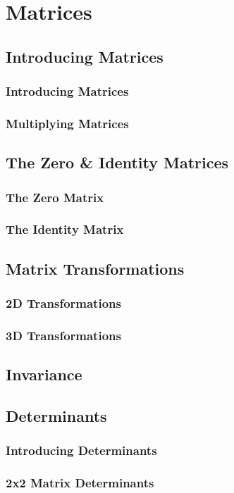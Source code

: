 \documentclass[../maths.tex]{subfiles}
\begin{document}
\chapter{Matrices}
\section{Introducing Matrices}
\subsection*{Introducing Matrices}
\subsection*{Multiplying Matrices}
\section{The Zero \& Identity Matrices}
\subsection*{The Zero Matrix}
\subsection*{The Identity Matrix}
\section{Matrix Transformations}
\subsection*{2D Transformations}
\subsection*{3D Transformations}
\section{Invariance}
\section{Determinants}
\subsection*{Introducing Determinants}
\subsection*{2x2 Matrix Determinants}
\end{document}
